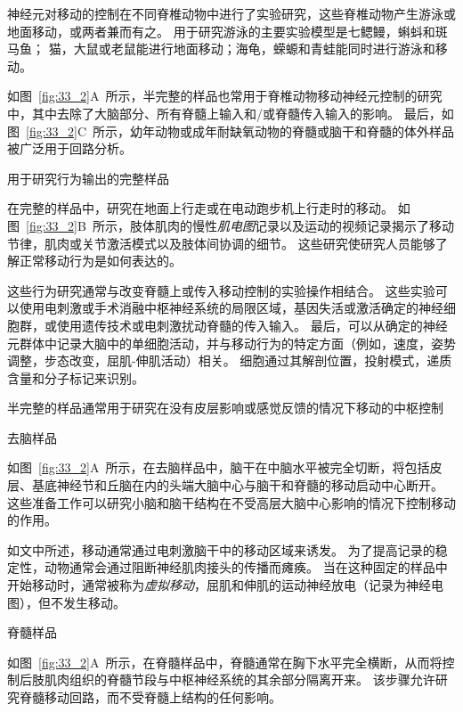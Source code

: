 \begin{proposition}[用于研究移动神经元控制的样品] \label{box:33_1}
	
	\quad \quad 神经元对移动的控制在不同脊椎动物中进行了实验研究，这些脊椎动物产生游泳或地面移动，或两者兼而有之。
	用于研究游泳的主要实验模型是七鳃鳗，蝌蚪和斑马鱼；
	猫，大鼠或老鼠能进行地面移动；海龟，蝾螈和青蛙能同时进行游泳和移动。
	
	\quad \quad 如图~\ref{fig:33_2}A~所示，半完整的样品也常用于脊椎动物移动神经元控制的研究中，其中去除了大脑部分、所有脊髓上输入和/或脊髓传入输入的影响。
	最后，如图~\ref{fig:33_2}C~所示，幼年动物或成年耐缺氧动物的脊髓或脑干和脊髓的体外样品被广泛用于回路分析。
	
	\quad \quad \textcolor[HTML]{00A652}{用于研究行为输出的完整样品}
		
	\quad \quad 在完整的样品中，研究在地面上行走或在电动跑步机上行走时的移动。
	如图~\ref{fig:33_2}B~所示，肢体肌肉的慢性\textit{肌电图}记录以及运动的视频记录揭示了移动节律，肌肉或关节激活模式以及肢体间协调的细节。
	这些研究使研究人员能够了解正常移动行为是如何表达的。
	
	\quad \quad 这些行为研究通常与改变脊髓上或传入移动控制的实验操作相结合。
	这些实验可以使用电刺激或手术消融中枢神经系统的局限区域，基因失活或激活确定的神经细胞群，或使用遗传技术或电刺激扰动脊髓的传入输入。
	最后，可以从确定的神经元群体中记录大脑中的单细胞活动，并与移动行为的特定方面（例如，速度，姿势调整，步态改变，屈肌-伸肌活动）相关。
	细胞通过其解剖位置，投射模式，递质含量和分子标记来识别。
	
	
	\quad \quad \textcolor[HTML]{00A652}{半完整的样品通常用于研究在没有皮层影响或感觉反馈的情况下移动的中枢控制}
	
	\quad \quad \textcolor[HTML]{00AEF7}{去脑样品}
	
	\quad \quad 如图~\ref{fig:33_2}A~所示，在去脑样品中，脑干在中脑水平被完全切断，将包括皮层、基底神经节和丘脑在内的头端大脑中心与脑干和脊髓的移动启动中心断开。
	这些准备工作可以研究小脑和脑干结构在不受高层大脑中心影响的情况下控制移动的作用。
	
	\quad \quad 如文中所述，移动通常通过电刺激脑干中的移动区域来诱发。
	为了提高记录的稳定性，动物通常会通过阻断神经肌肉接头的传播而瘫痪。
	当在这种固定的样品中开始移动时，通常被称为\textit{虚拟移动}，屈肌和伸肌的运动神经放电（记录为神经电图），但不发生移动。
	
	\quad \quad \textcolor[HTML]{00AEF7}{脊髓样品}
	
	\quad \quad 如图~\ref{fig:33_2}A~所示，在脊髓样品中，脊髓通常在胸下水平完全横断，从而将控制后肢肌肉组织的脊髓节段与中枢神经系统的其余部分隔离开来。
	该步骤允许研究脊髓移动回路，而不受脊髓上结构的任何影响。
	

\end{proposition}
